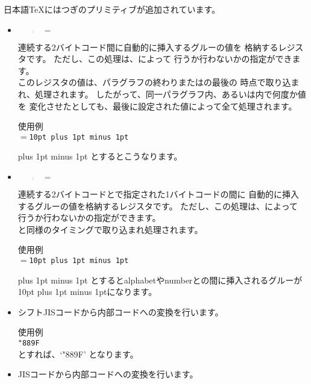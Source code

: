 日本語\TeX にはつぎのプリミティブが追加されています。
\begin{itemize}
\item {}
	\begin{quote}
	$=$
	\end{quote}
	連続する2バイトコード間に自動的に挿入するグルーの値を
	格納するレジスタです。
	ただし、この処理は、によって
	行うか行わないかの指定ができます。\\
	このレジスタの値は、パラグラフの終わりまたはの最後の
	時点で取り込まれ、処理されます。
	したがって、同一パラグラフ内、あるいは内で何度か値を
	変化させたとしても、最後に設定された値によって全て処理されます。

	\noindent
	使用例\\
	{\tt{}$=$10pt plus 1pt minus 1pt}\\
	{\kanjiskip=10pt plus 1pt minus 1pt
	とするとこうなります。\par}
\item {}
	\begin{quote}
	$=$
	\end{quote}
	連続する2バイトコードとで指定された1バイトコードの間に
	自動的に挿入するグルーの値を格納するレジスタです。
	ただし、この処理は、によって
	行うか行わないかの指定ができます。\\
	と同様のタイミングで取り込まれ処理されます。

	\noindent
	使用例\\
	{\tt{}$=$10pt plus 1pt minus 1pt}\\
	{\xkanjiskip=10pt plus 1pt minus 1pt
	とするとalphabetやnumberとの間に挿入されるグルーが
	10pt plus 1pt minus 1ptになります。\par}
\item {}
	\begin{quote}
	\end{quote}
	シフトJISコードから内部コードへの変換を行います。

	\noindent
	使用例\\
	{\tt{}"889F}\\
	とすれば、`\char\sjis"889F' となります。
\item {}
	\begin{quote}
	\end{quote}
	JISコードから内部コードへの変換を行います。


\end{itemize}
